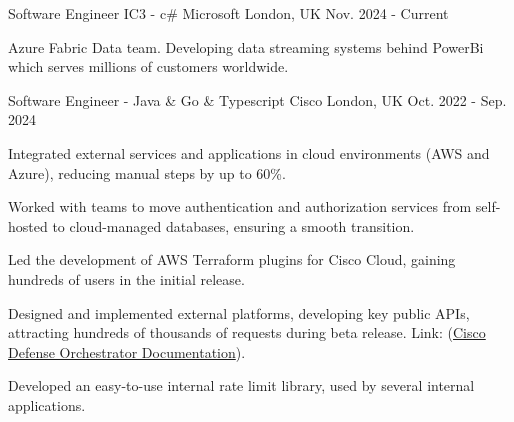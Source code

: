 

\begin{cventries}


\cventry
    {Software Engineer IC3 - c\#} %
    {Microsoft} %
    {London, UK} %
    {Nov. 2024 - Current} %
    {
      \begin{cvitems} %
        \item {Azure Fabric Data team. Developing data streaming systems behind PowerBi which serves millions of customers worldwide.}
      \end{cvitems}
    }


\cventry
    {Software Engineer - Java \& Go \& Typescript} %
    {Cisco} %
    {London, UK} %
    {Oct. 2022 - Sep. 2024} %
    {
      \begin{cvitems} %
        \item {Integrated external services and applications in cloud environments (AWS and Azure), reducing manual steps by up to 60\%.}
        \item {Worked with teams to move authentication and authorization services from self-hosted to cloud-managed databases, ensuring a smooth transition.}
        \item {Led the development of AWS Terraform plugins for Cisco Cloud, gaining hundreds of users in the initial release.}
        \item {Designed and implemented external platforms, developing key public APIs, attracting hundreds of thousands of requests during beta release. Link: (\href{https://developer.cisco.com/docs/cisco-defense-orchestrator/}{Cisco Defense Orchestrator Documentation}).}
        \item {Developed an easy-to-use internal rate limit library, used by several internal applications.}
      \end{cvitems}
    }


\end{cventries}

